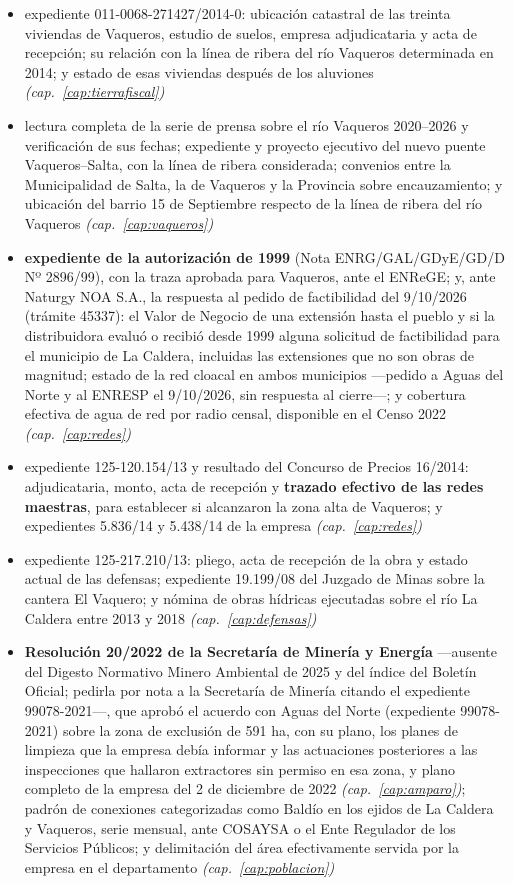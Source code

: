 \begin{itemize}[leftmargin=*]
\item expediente 011-0068-271427/2014-0: ubicación catastral de las treinta viviendas de Vaqueros, estudio de suelos, empresa adjudicataria y acta de recepción; su relación con la línea de ribera del río Vaqueros determinada en 2014; y estado de esas viviendas después de los aluviones \textit{(cap.\ \ref{cap:tierrafiscal})}
\item lectura completa de la serie de prensa sobre el río Vaqueros 2020--2026 y verificación de sus fechas; expediente y proyecto ejecutivo del nuevo puente Vaqueros--Salta, con la línea de ribera considerada; convenios entre la Municipalidad de Salta, la de Vaqueros y la Provincia sobre encauzamiento; y ubicación del barrio 15 de Septiembre respecto de la línea de ribera del río Vaqueros \textit{(cap.\ \ref{cap:vaqueros})}
\item \textbf{expediente de la autorización de 1999} (Nota ENRG/GAL/GDyE/GD/D Nº 2896/99), con la traza aprobada para Vaqueros, ante el ENReGE; y, ante Naturgy NOA S.A., la respuesta al pedido de factibilidad del 9/10/2026 (trámite 45337): el Valor de Negocio de una extensión hasta el pueblo y si la distribuidora evaluó o recibió desde 1999 alguna solicitud de factibilidad para el municipio de La Caldera, incluidas las extensiones que no son obras de magnitud; estado de la red cloacal en ambos municipios ---pedido a Aguas del Norte y al ENRESP el 9/10/2026, sin respuesta al cierre---; y cobertura efectiva de agua de red por radio censal, disponible en el Censo 2022 \textit{(cap.\ \ref{cap:redes})}
\item expediente 125-120.154/13 y resultado del Concurso de Precios 16/2014: adjudicataria, monto, acta de recepción y \textbf{trazado efectivo de las redes maestras}, para establecer si alcanzaron la zona alta de Vaqueros; y expedientes 5.836/14 y 5.438/14 de la empresa \textit{(cap.\ \ref{cap:redes})}
\item expediente 125-217.210/13: pliego, acta de recepción de la obra y estado actual de las defensas; expediente 19.199/08 del Juzgado de Minas sobre la cantera El Vaquero; y nómina de obras hídricas ejecutadas sobre el río La Caldera entre 2013 y 2018 \textit{(cap.\ \ref{cap:defensas})}
\item \textbf{Resolución 20/2022 de la Secretaría de Minería y Energía} ---ausente del Digesto Normativo Minero Ambiental de 2025 y del índice del Boletín Oficial; pedirla por nota a la Secretaría de Minería citando el expediente 99078-2021---, que aprobó el acuerdo con Aguas del Norte (expediente 99078-2021) sobre la zona de exclusión de 591 ha, con su plano, los planes de limpieza que la empresa debía informar y las actuaciones posteriores a las inspecciones que hallaron extractores sin permiso en esa zona, y plano completo de la empresa del 2 de diciembre de 2022 \textit{(cap.\ \ref{cap:amparo})}; padrón de conexiones categorizadas como Baldío en los ejidos de La Caldera y Vaqueros, serie mensual, ante COSAYSA o el Ente Regulador de los Servicios Públicos; y delimitación del área efectivamente servida por la empresa en el departamento \textit{(cap.\ \ref{cap:poblacion})}

\end{itemize}
